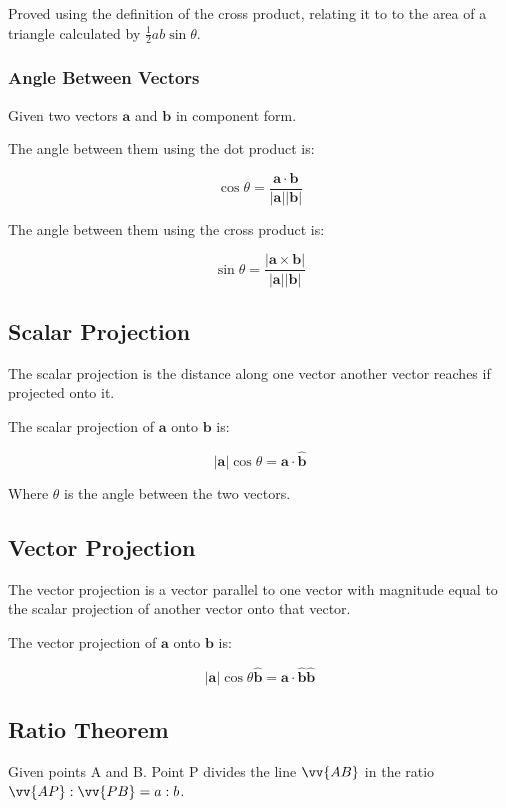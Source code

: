 \documentclass[a4paper,11pt]{article}
\newcommand{\bb}{\boldsymbol}
\begin{document}
Proved using the definition of the cross product, relating it to to the area of
a triangle calculated by $\frac{1}{2} a b \sin{\theta}$.


\subsubsection{Angle Between Vectors}

Given two vectors $\bb{a}$ and $\bb{b}$ in component form.

The angle between them using the dot product is:

$$
\cos{\theta} = \frac{\bb{a} \cdot \bb{b}}{\lvert \bb{a} \rvert \lvert \bb{b} \rvert}
$$

The angle between them using the cross product is:

$$
\sin{\theta} = \frac{\lvert \bb{a} \times \bb{b} \rvert}{\lvert \bb{a} \rvert \lvert \bb{b} \rvert}
$$


\subsection{Scalar Projection}

The scalar projection is the distance along one vector another vector reaches if
projected onto it.

The scalar projection of $\bb{a}$ onto $\bb{b}$ is:

$$
\lvert \bb{a} \rvert \cos{\theta} = \bb{a} \cdot \hat{\bb{b}}
$$

Where $\theta$ is the angle between the two vectors.


\subsection{Vector Projection}

The vector projection is a vector parallel to one vector with magnitude equal to
the scalar projection of another vector onto that vector.

The vector projection of $\bb{a}$ onto $\bb{b}$ is:

$$
\lvert \bb{a} \rvert \cos{\theta} \hat{\bb{b}} = \bb{a} \cdot \hat{\bb{b}} \hat{\bb{b}}
$$


\subsection{Ratio Theorem}

Given points A and B. Point P divides the line $\vv{AB}$ in the ratio
$\vv{AP} : \vv{PB} = a : b$.
\end{document}
